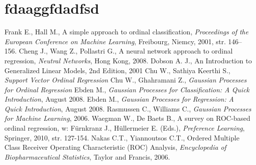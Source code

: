 \documentclass{mini}
\begin{document}

\appendix

\chapter{fdaaggfdadfsd}


\begin{thebibliography}{9}
	 Frank E., Hall M., A simple approach to ordinal classification, \emph{Proceedings of the European Conference on Machine Learning}, Freibourg, Niemcy, 2001, str. 146--156.
	 Cheng J., Wang Z., Pollastri G., A neural network approach to ordinal regression, \emph{Neutral Networks}, Hong Kong, 2008.
	 Dobson A. J., An Introduction to Generalized Linear Models, 2nd Edition, 2001 
	 Chu W., Sathiya Keerthi S., \emph{Support Vector Ordinal Regression}
	 Chu W., Ghahramani Z., \emph{Gaussian Processes for Ordinal Regression}
	 Ebden M., \emph{Gaussian Processes for Classification: A Quick Introduction}, August 2008.
	 Ebden M., \emph{Gaussian Processes for Regression: A Quick Introduction}, August 2008.
	 Rasmussen C., Williams C., \emph{Gaussian Processes for Machine Learning}, 2006.
	 Waegman W., De Baets B., A survey on ROC-based ordinal regression, w: Fürnkranz J., Hüllermeier E. (Eds.), \emph{Preference Learning}, Springer, 2010, str. 127-154.
	 Nakas C.T., Yiannoutsos C.T., Ordered Multiple Class Receiver Operating Characteristic (ROC) Analysis, \emph{Encyclopedia of Biopharmaceutical Statistics}, Taylor and Francis, 2006.
\end{thebibliography}


\makestatement
\end{document}
